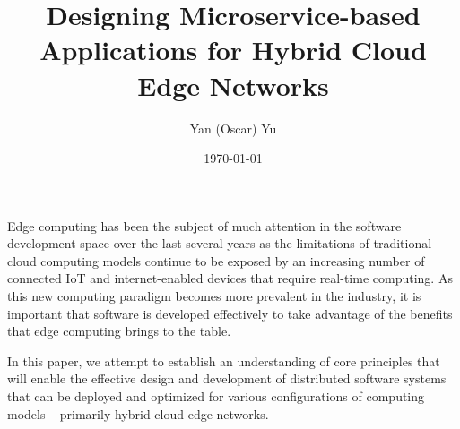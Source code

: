 \documentclass[11pt]{article}
\title{Designing Microservice-based Applications for Hybrid Cloud Edge Networks}
\author{Yan (Oscar) Yu}
\date{\today}
\begin{document}




Edge computing has been the subject of much attention in the software
development space over the last several years as the limitations of traditional cloud computing 
models continue to be exposed by an increasing number of connected IoT and internet-enabled 
devices that require real-time computing. As this new computing paradigm becomes more prevalent 
in the industry, it is important that software is developed effectively to take advantage of the
benefits that edge computing brings to the table.
\newline

In this paper, we attempt to establish an understanding of core principles that will enable
the effective design and development of distributed software systems that can be deployed and 
optimized for various configurations of computing models -- primarily hybrid cloud edge networks.




\end{document}
